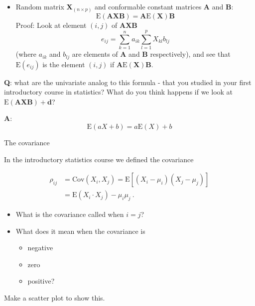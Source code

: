 \documentclass[ignorenonframetext,]{beamer}
\providecommand{\tightlist}{%
  \setlength{\itemsep}{0pt}\setlength{\parskip}{0pt}}
\begin{document}
\begin{frame}

\begin{itemize}
\tightlist
\item
  Random matrix \(\mathbf{X}_{(n\times p)}\) and conformable constant
  matrices \(\mathbf{A}\) and \(\mathbf{B}\):
  \[\text{E}(\mathbf{A}\mathbf{X}\mathbf{B})=\mathbf{A}\text{E}(\mathbf{X})\mathbf{B}\]
  Proof: Look at element \((i,j)\) of \(\mathbf{A}\mathbf{X}\mathbf{B}\)
  \[e_{ij}=\sum_{k=1}^n a_{ik} \sum_{l=1}^p X_{kl}b_{lj}\] (where
  \(a_{ik}\) and \(b_{lj}\) are elements of \(\mathbf{A}\) and
  \(\mathbf{B}\) respectively), and see that \(\text{E}(e_{ij})\) is the
  element \((i,j)\) if \(\mathbf{A}\text{E}(\mathbf{X})\mathbf{B}\).
\end{itemize}

\textbf{Q}: what are the univariate analog to this formula - that you
studied in your first introductory course in statistics? What do you
think happens if we look at
\(\text{E}(\mathbf{A}\mathbf{X}\mathbf{B})+\mathbf{d}\)?

\textbf{A}: \[\text{E}(aX+b)=a \text{E}(X)+b\]

\end{frame}

\begin{frame}

\begin{block}{The covariance}

\vspace{2mm}

In the introductory statistics course we defined the covariance

\begin{align*}
\rho_{ij} & =\text{Cov}(X_i,X_j)  =\text{E}[(X_i-\mu_i)(X_j-\mu_j)] \\
& =\text{E}(X_i \cdot X_j)-\mu_i\mu_j \ . 
\end{align*}

\begin{itemize}
\tightlist
\item
  What is the covariance called when \(i=j\)?
\item
  What does it mean when the covariance is

  \begin{itemize}
  \tightlist
  \item
    negative
  \item
    zero
  \item
    positive?
  \end{itemize}
\end{itemize}

Make a scatter plot to show this.

\end{block}

\end{frame}
\end{document}

